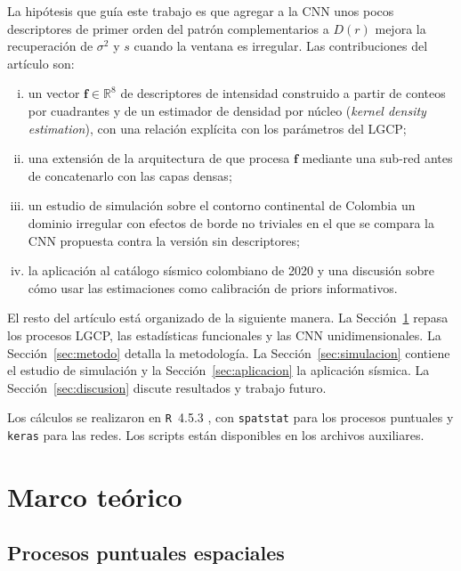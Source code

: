 \documentclass[a4paper,fleqn]{cas-sc}
\numberwithin{equation}{section}
\begin{document}
La hip\'otesis que gu\'ia este trabajo es que agregar a la CNN unos pocos
descriptores de primer orden del patr\'on complementarios a $D(r)$ mejora
la recuperaci\'on de $\sigma^2$ y $s$ cuando la ventana es irregular. Las
contribuciones del art\'iculo son:
\begin{enumerate}[(i)]
    \item un vector $\mathbf{f}\in\mathbb{R}^{8}$ de descriptores de
    intensidad construido a partir de conteos por cuadrantes y de un
    estimador de densidad por n\'ucleo (\textit{kernel density estimation}), con una relaci\'on expl\'icita con los par\'ametros del LGCP;

    \item una extensi\'on de la arquitectura de \citet{VIHRS2022} que procesa $\mathbf{f}$ mediante una sub-red antes de concatenarlo con las capas densas;

    \item un estudio de simulaci\'on sobre el contorno continental de
    Colombia un dominio irregular con efectos de borde no triviales en
    el que se compara la CNN propuesta contra la versi\'on sin descriptores;

    \item la aplicaci\'on al cat\'alogo s\'ismico colombiano de 2020 y una
    discusi\'on sobre c\'omo usar las estimaciones como calibraci\'on de
    priors informativos.
\end{enumerate}

El resto del art\'iculo est\'a organizado de la siguiente manera. La
Secci\'on~\ref{sec:marco} repasa los procesos LGCP, las estad\'isticas
funcionales y las CNN unidimensionales. La Secci\'on~\ref{sec:metodo} detalla la metodolog\'ia. La Secci\'on~\ref{sec:simulacion} contiene el estudio de simulaci\'on y la Secci\'on~\ref{sec:aplicacion} la aplicaci\'on s\'ismica. La Secci\'on~\ref{sec:discusion} discute resultados y trabajo futuro.

Los c\'alculos se realizaron en \texttt{R}~4.5.3 \citep{R}, con
\texttt{spatstat} \citep{spatstat} para los procesos puntuales y
\texttt{keras} \citep{keras_book,keras} para las redes. Los scripts est\'an disponibles en los archivos auxiliares.

\section{Marco te\'orico}
\label{sec:marco}

\subsection{Procesos puntuales espaciales}
\label{sec:pp_theory}
\end{document}
